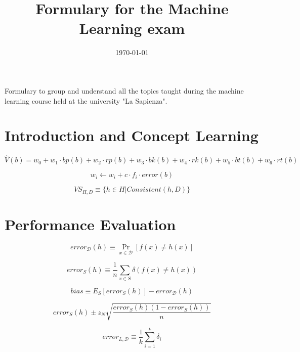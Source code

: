 \documentclass{article}
\title{Formulary for the Machine Learning exam}
\date{\today}
\begin{document}
\maketitle
Formulary to group and understand all the topics taught during the machine learning course held at the university "La Sapienza".

\section{Introduction and Concept Learning}

\begin{equation}
    \hat{V}(b) = w_0 + w_1 \cdot bp(b) + w_2 \cdot rp(b) + w_3 \cdot bk(b) + w_4 \cdot rk(b) + w_5 \cdot bt(b) + w_6 \cdot rt(b)
\end{equation}

\begin{equation}
    w_i \leftarrow w_i + c \cdot f_i \cdot error(b)
\end{equation}

\begin{equation}
    VS_{H,D} \equiv \{h \in H | Consistent(h, D)\}
\end{equation}


\section{Performance Evaluation}

\begin{equation}
    error_{\mathcal{D}}(h) \equiv \Pr_{x \in \mathcal{D}}[f(x) \neq h(x)]
\end{equation}

\begin{equation}
    error_S(h) \equiv \frac{1}{n} \sum_{x \in S} \delta(f(x) \neq h(x))
\end{equation}

\begin{equation}
    bias \equiv E_S[error_S(h)] - error_{\mathcal{D}}(h)
\end{equation}

\begin{equation}
    error_S(h) \pm z_N \sqrt{\frac{error_S(h)(1 - error_S(h))}{n}}
\end{equation}

\begin{equation}
    error_{L,\mathcal{D}} \equiv \frac{1}{k} \sum_{i=1}^k \delta_i
\end{equation}
\end{document}
